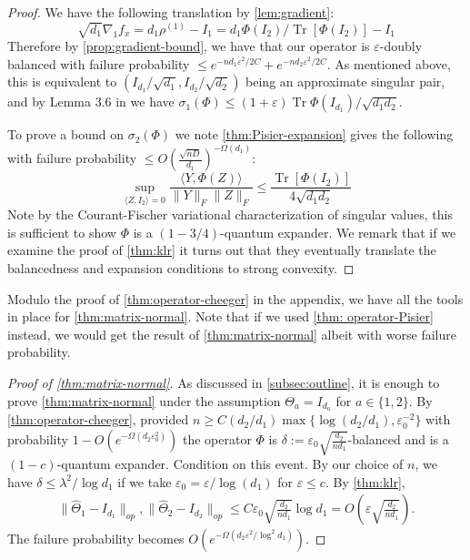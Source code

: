 \documentclass{article}
\newcommand\eps{\varepsilon}
\newcommand\tr{\operatorname{Tr}}
\begin{document}
\begin{proof}
We have the following translation by \cref{lem:gradient}: 
\[ \sqrt{d_{1}} \nabla_{1} f_{x} = d_{1} \rho^{(1)} - I_{1} = d_{1} \Phi(I_{2})/ \tr[\Phi(I_{2})] - I_{1}  \]
Therefore by \cref{prop:gradient-bound}, we have that our operator is $\eps$-doubly balanced with failure probability $\leq e^{-n d_{1} \eps^2/2C} + e^{-n d_{2} \eps^2/2C}$. As mentioned above, this is equivalent to $(I_{d_1}/\sqrt{d_1}, I_{d_2}/\sqrt{d_2})$ being an approximate singular pair, and by Lemma 3.6 in \cite{KLR19} we have $\sigma_1(\Phi) \leq (1+\eps)  \tr \Phi(I_{d_1})/\sqrt{d_1 d_2}$. 

To prove a bound on $\sigma_{2}(\Phi)$ we 
note \cref{thm:Pisier-expansion} gives the following with failure probability $\leq O \left(\frac {\sqrt{nD}}{d_1}\right)^{ - \Omega(d_1)}$:
\[ \sup_{\langle Z, I_{2} \rangle = 0} \frac{\langle Y, \Phi(Z) \rangle}{\|Y\|_{F} \|Z\|_{F}} \leq \frac{\tr[\Phi(I_{2})]}{4 \sqrt{d_{1} d_{2}}}       \]
Note by the Courant-Fischer variational characterization of singular values, this is sufficient to show $\Phi$ is a $(1-3/4)$-quantum expander. We remark that if we examine the proof of \cref{thm:klr} it turns out that they eventually translate the balancedness and expansion conditions to strong convexity. 
\end{proof}

Modulo the proof of \cref{thm:operator-cheeger} in the appendix, we have all the tools in place for \cref{thm:matrix-normal}. Note that if we used \cref{thm: operator-Pisier} instead, we would get the result of \cref{thm:matrix-normal} albeit with worse failure probability. 

\begin{proof}[Proof of \cref{thm:matrix-normal}] As discussed in \cref{subsec:outline}, it is enough to prove \cref{thm:matrix-normal} under the assumption $\Theta_a = I_{d_a}$ for $a \in \{1,2\}$. By \cref{thm:operator-cheeger}, provided $n \geq C (d_2/d_1) \max\{\log (d_2/d_1),  \eps_0^{-2}\} $ with probability $1 - O(e^{ - \Omega( d_2 \eps_0^2)})$ the operator $\Phi$ is $\delta:=\eps_0  \sqrt{\frac{d_2}{n d_1}}$-balanced and is a $(1 - c)$-quantum expander. Condition on this event. By our choice of $n$, we have $\delta \leq \lambda^2/\log d_1$ if we take $\eps_0 = \eps/\log(d_1)$ for $\eps \leq c$. By \cref{thm:klr},
\begin{gather*} \| \widehat{\Theta}_1 - I_{d_1}\|_{op}, \| \widehat{\Theta}_2 - I_{d_2}\|_{op} \leq C \eps_0 \sqrt{\frac{d_2}{n d_1}} \log d_1 = O\left(\eps \sqrt{\frac{d_2}{n d_1}}\right).\end{gather*}
The failure probability becomes $O(e^{ - \Omega( d_2 \eps^2/\log^2 d_1)})$.
\end{proof}
\end{document}
